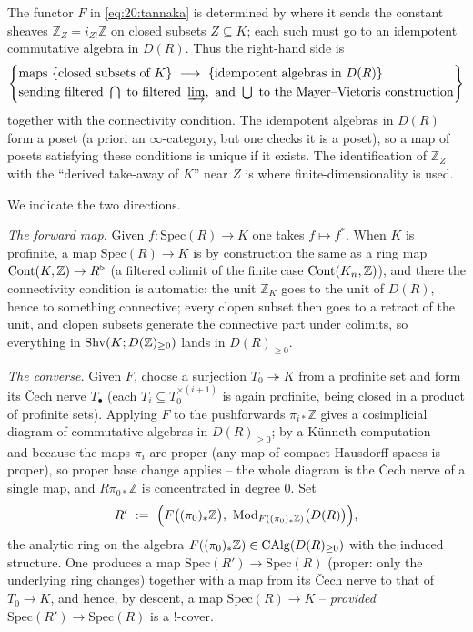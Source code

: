 \begin{remark}
\label{rmk:20:idempotents}
The functor $F$ in \eqref{eq:20:tannaka} is determined by where it sends the
constant sheaves $\mathbb Z_Z=i_{Z!}\mathbb Z$ on closed subsets $Z\subseteq K$;
each such must go to an idempotent commutative algebra in $D(R)$. Thus the
right-hand side is
\begin{equation*}
\left\{
\begin{aligned}
&\text{maps }\{\text{closed subsets of }K\}\ \longrightarrow\ \{\text{idempotent
algebras in }D(R)\}\\
&\text{sending filtered }\textstyle\bigcap\text{ to filtered }\varinjlim,\
\text{and }\bigcup\text{ to the Mayer--Vietoris construction}
\end{aligned}
\right\}
\end{equation*}
together with the connectivity condition. The idempotent algebras in $D(R)$ form
a poset (a priori an $\infty$-category, but one checks it is a poset), so a map
of posets satisfying these conditions is unique if it exists. The identification
of $\mathbb Z_Z$ with the ``derived take-away of $K$'' near $Z$ is where
finite-dimensionality is used.
\end{remark}

We indicate the two directions.

\emph{The forward map.} Given $f\colon\mathrm{Spec}(R)\to K$ one takes $f\mapsto
f^*$. When $K$ is profinite, a map $\mathrm{Spec}(R)\to K$ is by construction the
same as a ring map $\operatorname{Cont}(K,\mathbb Z)\to R^{\triangleright}$ (a filtered colimit of the
finite case $\operatorname{Cont}(K_n,\mathbb Z)$), and there the connectivity condition is
automatic: the unit $\mathbb Z_K$ goes to the unit of $D(R)$, hence to something
connective; every clopen subset then goes to a retract of the unit, and clopen
subsets generate the connective part under colimits, so everything in
$\operatorname{Shv}(K;D(\mathbb Z)_{\ge0})$ lands in $D(R)_{\ge0}$.

\emph{The converse.} Given $F$, choose a surjection $T_0\twoheadrightarrow K$
from a profinite set and form its \v Cech nerve $T_\bullet$ (each
$T_i\subseteq T_0^{\times(i+1)}$ is again profinite, being closed in a product of
profinite sets). Applying $F$ to the pushforwards $\pi_{i*}\mathbb Z$ gives a
cosimplicial diagram of commutative algebras in $D(R)_{\ge0}$; by a K\"unneth
computation -- and because the maps $\pi_i$ are proper (any map of compact
Hausdorff spaces is proper), so proper base change applies -- the whole diagram
is the \v Cech nerve of a single map, and $R\pi_{0*}\mathbb Z$ is concentrated in
degree $0$. Set
\begin{equation*}
R'\ :=\ \Bigl(F\bigl((\pi_0)_*\mathbb Z\bigr),\ \operatorname{Mod}_{F((\pi_0)_*\mathbb Z)}
\bigl(D(R)\bigr)\Bigr),
\end{equation*}
the analytic ring on the algebra $F((\pi_0)_*\mathbb Z)\in\operatorname{CAlg}(D(R)_{\ge0})$
with the induced structure. One produces a map $\mathrm{Spec}(R')\to
\mathrm{Spec}(R)$ (proper: only the underlying ring changes) together with a map
from its \v Cech nerve to that of $T_0\to K$, and hence, by descent, a map
$\mathrm{Spec}(R)\to K$ -- \emph{provided} $\mathrm{Spec}(R')\to\mathrm{Spec}(R)$
is a $!$-cover.

